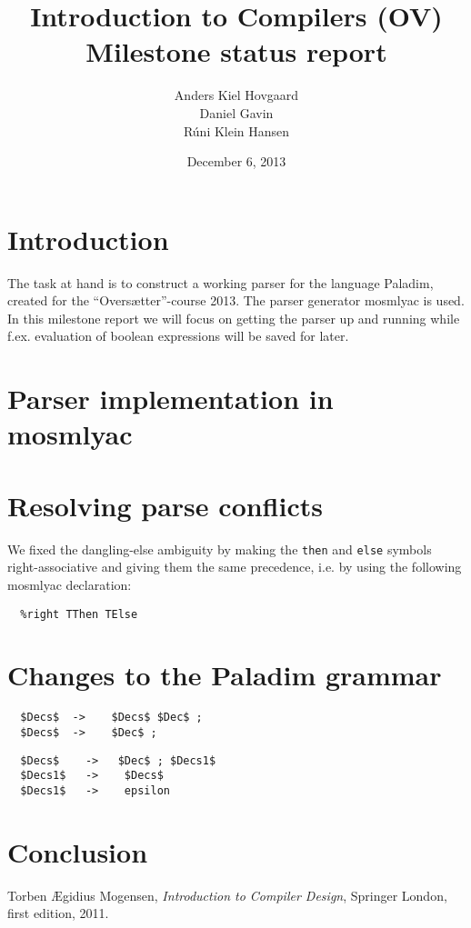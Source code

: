 \documentclass[12pt,a4paper]{article}
\begin{document}
\title{Introduction to Compilers (OV)\\
       Milestone status report}
\author{Anders Kiel Hovgaard\\
        Daniel Gavin\\
        Rúni Klein Hansen}
\date{December 6, 2013}
\maketitle

\section{Introduction}
The task at hand is to construct a working parser for the language Paladim,
created for the ``Oversætter''-course 2013. The parser generator mosmlyac is
used.\\
In this milestone report we will focus on getting the parser up and running
while f.ex. evaluation of boolean expressions will be saved for later.


\section{Parser implementation in mosmlyac}


\section{Resolving parse conflicts}
We fixed the dangling-else ambiguity by making the \texttt{then} and
\texttt{else} symbols right-associative and giving them the same precedence,
i.e. by using the following mosmlyac declaration:
\begin{verbatim}
  %right TThen TElse 
\end{verbatim}

\section{Changes to the Paladim grammar}
\begin{lstlisting}
  $Decs$  ->    $Decs$ $Dec$ ;
  $Decs$  ->    $Dec$ ;
\end{lstlisting}
\begin{lstlisting}
  $Decs$    ->   $Dec$ ; $Decs1$
  $Decs1$   ->    $Decs$
  $Decs1$   ->    epsilon
\end{lstlisting}



\section{Conclusion}

\begin{thebibliography}{9}
    Torben Ægidius Mogensen,
    \emph{Introduction to Compiler Design},
    Springer London, first edition, 2011.
\end{thebibliography}
\end{document}
